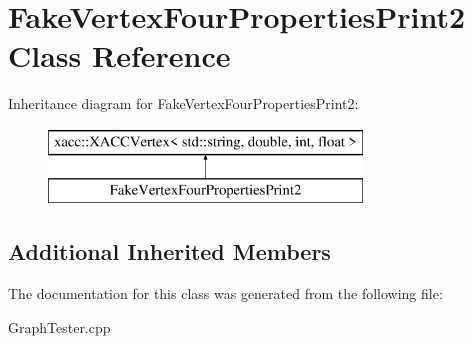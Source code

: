 \hypertarget{a01575}{}\section{Fake\+Vertex\+Four\+Properties\+Print2 Class Reference}
\label{a01575}
Inheritance diagram for Fake\+Vertex\+Four\+Properties\+Print2\+:\begin{figure}[H]
\begin{center}
\leavevmode
\includegraphics[height=2.000000cm]{a01575}
\end{center}
\end{figure}
\subsection*{Additional Inherited Members}


The documentation for this class was generated from the following file\+:\begin{DoxyCompactItemize}
\item 
Graph\+Tester.\+cpp\end{DoxyCompactItemize}
